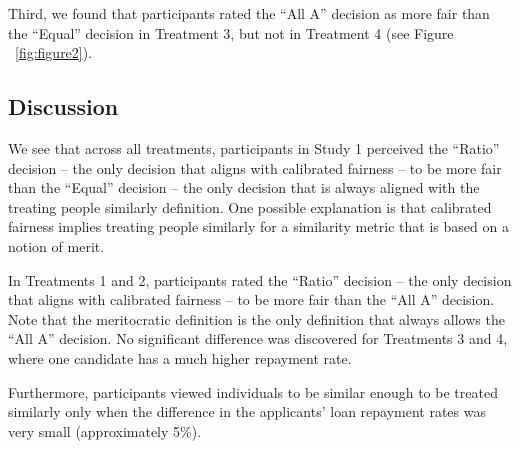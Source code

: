 \documentclass[letterpaper]{article} %
\begin{document}
Third, we found that participants rated the ``All A'' decision as more fair than the ``Equal'' decision in Treatment 3, but not in Treatment 4 (see Figure ~\ref{fig:figure2}). 


 
\subsection{Discussion}

We see that across all treatments, participants in Study 1 perceived the ``Ratio'' decision -- the only decision that aligns with calibrated fairness -- to be more fair than  the ``Equal'' decision -- the only decision that is always aligned with the treating people similarly definition. One possible explanation is that calibrated fairness implies treating people similarly for a similarity metric \cite{liu2017calibrated} that is based on a notion of merit. 

In Treatments 1 and 2, participants rated the ``Ratio'' decision -- the only decision that aligns with calibrated fairness -- to be more fair than the ``All A'' decision. Note that the meritocratic definition is the only definition that always allows the ``All A'' decision. No significant difference was discovered for Treatments 3 and 4, where one candidate has a much higher repayment rate. 

Furthermore, participants viewed individuals to be similar enough to be treated similarly only when the difference in the applicants' loan repayment rates was very small (approximately 5\%).


\end{document}
